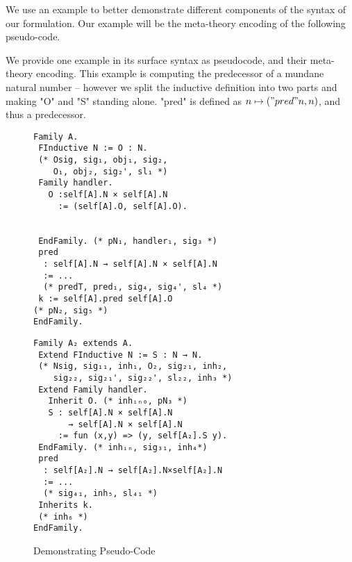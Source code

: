 We use an example to better demonstrate different components of the syntax of our formulation. Our example will be the meta-theory encoding of the following pseudo-code.

We provide one example in its surface syntax as pseudocode, and their meta-theory encoding. This example is computing the predecessor of a mundane natural number -- however we split the inductive definition into two parts and making "O" and "S" standing alone. "pred" is defined as $n \mapsto ("pred" n, n)$, and thus a predecessor.




\begin{figure}[H]\label{fig:example-pseudocode}
\begin{minipage}[t]{0.5\linewidth}
\begin{verbatim}
Family A.
 FInductive N := O : N. 
 (* Osig, sig₁, obj₁, sig₂,
    O₁, obj₂, sig₂', sl₁ *)
 Family handler.
   O :self[A].N × self[A].N 
     := (self[A].O, self[A].O). 


 EndFamily. (* pN₁, handler₁, sig₃ *)
 pred 
  : self[A].N → self[A].N × self[A].N 
  := ... 
  (* predT, pred₁, sig₄, sig₄', sl₄ *) 
 k := self[A].pred self[A].O 
(* pN₂, sig₅ *)
EndFamily.
\end{verbatim}
  \end{minipage}
  \begin{minipage}[t]{0.45\linewidth}
\begin{verbatim}
Family A₂ extends A.
 Extend FInductive N := S : N → N.
 (* Nsig, sig₁₁, inh₁, O₂, sig₂₁, inh₂, 
    sig₂₂, sig₂₁', sig₂₂', sl₂₂, inh₃ *)
 Extend Family handler.
   Inherit O. (* inhᵢₙ₀, pN₃ *)
   S : self[A].N × self[A].N 
       → self[A].N × self[A].N 
     := fun (x,y) => (y, self[A₂].S y).
 EndFamily. (* inhᵢₙ, sig₃₁, inh₄*)
 pred 
  : self[A₂].N → self[A₂].N×self[A₂].N 
  := ... 
  (* sig₄₁, inh₅, sl₄₁ *)
 Inherits k. 
 (* inh₆ *)
EndFamily.
    \end{verbatim}
  \end{minipage}
  \caption{Demonstrating Pseudo-Code}
\end{figure}

